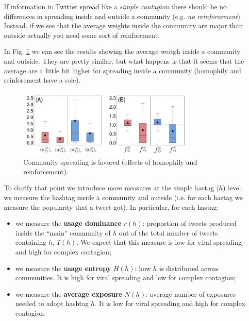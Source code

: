 \documentclass[../main/main.tex]{subfiles}
\begin{document}
If information in Twitter spread like a \emph{simple contagion} there should be no differences in spreading inside and outside a community (e.g. \emph{no reinforcement})
Instead, if we see that the average weights inside the community are major than outside actually you need some sort of reinforcment.

In Fig. \ref{fig:11_4} we can see the results showing the average weitgh inside a community and outside. They are pretty similar, but what happens is that it seems that the average are a little bit higher for spreading inside a community (homophily and reinforcment have a role).

\begin{figure}[h!]
\centering
\includegraphics[width=0.8\textwidth]{../lessons/image/11/4.png}
\caption{\label{fig:11_4}  Community spreading is favored (effects of homophily and reinforcement).}
\end{figure}



To clarify that point we introduce more measures at the simple hastag (\( h \)) level: we measure the hashtag inside a community and outside (i.e. for each hastag we measure the popularity that a tweet got). In particular, for each hastag:
\begin{itemize}

\item we measure the \textbf{usage dominance} $r(h)$: proportion of tweets produced inside the “main” community of $h$ out of the total number of tweets
containing $h$, $T(h)$. We expect that this measure is low for viral spreading and high for complex contagion;

\item we measure the \textbf{usage entropy} \( H(h) \): how \( h \) is distributed across communities. It is high for viral spreading and low for complex contagion;

\item we measure the \textbf{average exposure} $N(h)$: average number of exposures needed to adopt hashtag $h$. It is low for viral spreading and high for complex contagion.

\end{itemize}
\end{document}
